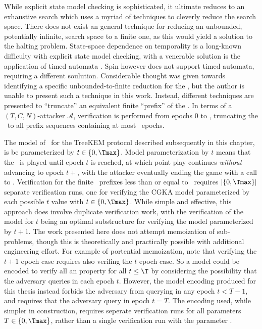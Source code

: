 While explicit state model checking is sophisticated, it ultimate reduces to an exhaustive search which uses a myriad of techniques to cleverly reduce the search space.
There does not exist an general technique for reducing an unbounded, potentially infinite, search space to a finite one, as this would yield a solution to the halting problem.
State-space dependence on temporality is a long-known difficulty with explicit state model checking, with a venerable solution is the application of timed automata \autocite{@alur1994theory}.
Spin however does not support timed automata, requiring a different soulution.
Considerable thought was given towards identifying a specific unbounded-to-finite reduction for the \CGKAsec, but the author is unable to present such a technique in this work.
Instead, different techniques are presented to ``truncate'' an equivalent finite ``prefix'' of the \CGKAsec.
In terms of a \((T, C, N)\)-attacker \(\mathcal{A}\), verification is performed from epochs $0$ to \Tmax, truncating the \CGKAsec\ to all prefix sequences containing at most \Tmax\ epochs.

The model of \CGKAsec\ for the TreeKEM protocol described subsequently in this chapter, is be parameterized by $t \in \{ 0, \Tmax \}$.
Model parameterization by $t$ means that the \CGKAsec\ is played until epoch $t$ is reached, at which point play continues \emph{without} advancing to epoch $t+$, with the attacker eventually ending the game with a call to .
Verification for the finite \CGKAsec\ prefixes less than or equal to \Tmax\ requires $|\{ 0, \Tmax \}|$ separate verification runs, one for verifying the CGKA model parameterized by each possible $t$ value with $t \in \{ 0, \Tmax \}$.
While simple and effective, this approach does involve duplicate verification work, with the verification of the model for $t$ being an optimal substructure for verifying the model parameterized by $t+1$.
The work presented here does not attempt memoization of sub-problems, though this is theoretically and practically possible with additional engineering effort.
For example of portential memoization, note that verifying the \(t+1\) epoch case requires also verifing the \(t\) epoch case.
So a model  could be encoded to verify all an  property for all \(t \le \T\) by considering the possibility that the adversary queries  in each epoch \(t\).
However, the model encoding produced for this thesis instead forbids the adversary from querying  in any epoch \(t < T - 1 \), and requires that the adversary query  in epoch \(t = T\).
The encoding used, while simpler in construction, requires seperate verification runs for all parameters \(T \in \{ 0, \Tmax \}\), rather than a single verification run with the parameter \Tmax.

